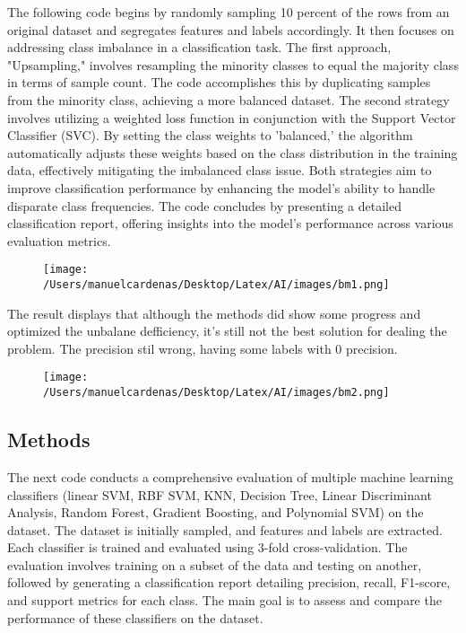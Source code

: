 \documentclass{article}
\begin{document}
    The following code begins by randomly sampling 10 percent of the rows from an original dataset and segregates 
    features and labels accordingly. It then focuses on addressing class imbalance in a classification task. The first approach, 
    "Upsampling," involves resampling the minority classes to equal the majority class in terms of sample count. The code accomplishes 
    this by duplicating samples from the minority class, achieving a more balanced dataset. The second strategy involves 
    utilizing a weighted loss function in conjunction with the Support Vector Classifier (SVC). By setting the class weights 
    to 'balanced,' the algorithm automatically adjusts these weights based on the class distribution in the training data, 
    effectively mitigating the imbalanced class issue. Both strategies aim to improve classification performance by enhancing 
    the model's ability to handle disparate class frequencies. The code concludes by presenting a detailed classification report, 
    offering insights into the model's performance across various evaluation metrics.\pagebreak
    \begin{figure}[h]
        \centering
        \texttt{[image: /Users/manuelcardenas/Desktop/Latex/AI/images/bm1.png]}
        \label{fig:bm1}
    \end{figure}

    The result displays that although the methods did show some progress and optimized the unbalane defficiency, 
    it's still not the best solution for dealing the problem. The precision stil wrong, having some labels with 0 precision. \pagebreak
    \begin{figure}[h]
        \centering
        \texttt{[image: /Users/manuelcardenas/Desktop/Latex/AI/images/bm2.png]}
        \label{fig:bm2}
    \end{figure}

    \subsection{Methods}

    The next code conducts a comprehensive evaluation of multiple machine learning classifiers 
    (linear SVM, RBF SVM, KNN, Decision Tree, Linear Discriminant Analysis, Random Forest, Gradient Boosting, and Polynomial SVM) 
    on the dataset. The dataset is initially sampled, and features and labels are extracted. Each classifier is trained and evaluated 
    using 3-fold cross-validation. The evaluation involves training on a subset of the data and testing on another, followed by 
    generating a classification report detailing precision, recall, F1-score, and support metrics for each class. The main goal is 
    to assess and compare the performance of these classifiers on the dataset.\pagebreak
\end{document}
